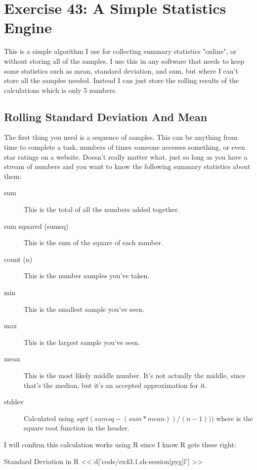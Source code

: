 \chapter{Exercise 43: A Simple Statistics Engine}

This is a simple algorithm I use for collecting summary statistics "online", 
or without storing all of the samples.  I use this in any software that needs
to keep some statistics such as mean, standard deviation, and sum, but where
I can't store all the samples needed.  Instead I can just store the rolling
results of the calculations which is only 5 numbers.

\section{Rolling Standard Deviation And Mean}

The first thing you need is a sequence of samples.  This can be anything
from time to complete a task, numbers of times someone accesses something,
or even star ratings on a website.  Doesn't really matter what, just so long
as you have a stream of numbers and you want to know the following summary
statistics about them:

\begin{description}
\item[sum] This is the total of all the numbers added together.
\item[sum squared (sumsq)] This is the sum of the square of each number.
\item[count (n)] This is the number samples you've taken.
\item[min] This is the smallest sample you've seen.
\item[max] This is the largest sample you've seen.
\item[mean] This is the most likely middle number.  It's not actually the middle,
    since that's the median, but it's an accepted approximation for it.
\item[stddev] Calculated using $sqrt(sumsq - (sum * mean)) / (n - 1) ))$ where  is the square root function in the  header.
\end{description}

I will confirm this calculation works using R since I know R gets 
these right:

\begin{code}{Standard Deviation in R}
<< d['code/ex43.1.sh-session|pyg|l'] >>
\end{code}

